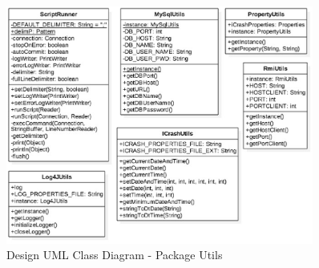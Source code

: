 \begin{figure}[h!]
	\centering
	\includegraphics[width=0.9\textwidth]{./images/dcm_utils.eps}
	\caption{Design UML Class Diagram - Package Utils}
\end{figure}


